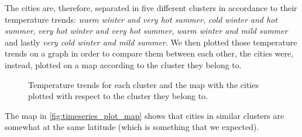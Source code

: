 The cities are, therefore, separated in five different clusters in accordance to their temperature trends: \textit{warm winter and very hot summer}, \textit{cold winter and hot summer}, \textit{very hot winter and very hot summer}, \textit{warm winter and mild summer} and lastly \textit{very cold winter and mild summer}.
We then plotted those temperature trends on a graph in order to compare them between each other, the cities were, instead, plotted on a map according to the cluster they belong to.
\begin{figure}[H]
    \centering
    \caption{Temperature trends for each cluster and the map with the cities plotted with respect to the cluster they belong to.}
    \label{fig:timeseries_plot_map}
\end{figure}
The map in \autoref{fig:timeseries_plot_map} shows that cities in similar clusters are somewhat at the same latitude (which is something that we expected).

